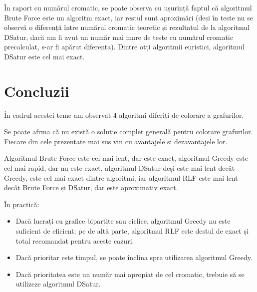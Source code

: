 \documentclass[runningheads]{llncs}
\begin{document}
În raport cu numărul cromatic, se poate observa cu ușurință faptul că algoritmul
Brute Force este un algoritm exact, iar restul sunt aproximări (deși în teste 
nu se observă o diferență între numărul cromatic teoretic și rezultatul de la algoritmul DSatur, dacă
am fi avut un număr mai mare de teste cu numărul cromatic precalculat, s-ar fi apărut diferența).
Dintre otți algoritmii euristici, algoritmul DSatur este cel mai exact.

\section{Concluzii}
În cadrul acestei teme am observat 4 algoritmi diferiți de colorare a grafurilor.

Se poate afrma că nu există o soluție complet generală pentru colorare grafurilor.
Fiecare din cele prezentate mai sus vin cu avantajele și dezavantajele lor.

Algoritmul Brute Force este cel mai lent, dar este exact, algoritmul Greedy este
cel mai rapid, dar nu este exact, algoritmul DSatur deși este mai lent decât Greedy,
este cel mai exact dintre algoritmi, iar algoritmul RLF este mai lent decât Brute Force și 
DSatur, dar este aproximativ exact.

În practică:
\begin{itemize}
    \item Dacă lucrați cu grafice bipartite sau ciclice, algoritmul Greedy nu este
    suficient de eficient; pe de altă parte, algoritmul RLF este destul de exact și total
    recomandat pentru aceste cazuri.
    \item Dacă prioritar este timpul, se poate înclina spre utilizarea algoritmul Greedy.
    \item Dacă prioritatea este un număr mai apropiat de cel cromatic, trebuie
    să se utilizeze algoritmul DSatur.

\end{itemize}
\pagebreak
\end{document}

